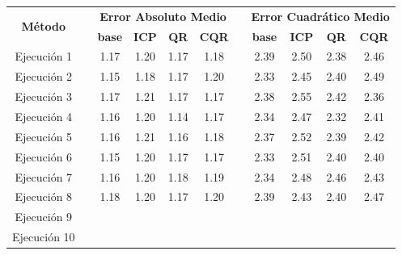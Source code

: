 \renewcommand{\arraystretch}{1.4}
\begin{table}[h]
    \small
    \begin{tabular}{clcccclcccc}
    \toprule
    \multirow{2}{*}{\textbf{Método}} &  & \multicolumn{4}{c}{\textbf{Error Absoluto Medio}}         &  & \multicolumn{4}{c}{\textbf{Error Cuadrático Medio}}           \\ \cline{3-6} \cline{8-11} 
                                    &  & \textbf{base} & \textbf{ICP} & \textbf{QR} & \textbf{CQR}  &  & \textbf{base} & \textbf{ICP} & \textbf{QR} & \textbf{CQR} \\ \cline{1-1} \cline{3-6} \cline{8-11} 
    Ejecución 1                      &  & 1.17          & 1.20         & 1.17        & 1.18         &  & 2.39          & 2.50         & 2.38        & 2.46         \\
    Ejecución 2                      &  & 1.15          & 1.18         & 1.17        & 1.20         &  & 2.33          & 2.45         & 2.40        & 2.49         \\
    Ejecución 3                      &  & 1.17          & 1.21         & 1.17        & 1.17         &  & 2.38          & 2.55         & 2.42        & 2.36         \\
    Ejecución 4                      &  & 1.16          & 1.20         & 1.14        & 1.17         &  & 2.34          & 2.47         & 2.32        & 2.41         \\
    Ejecución 5                      &  & 1.16          & 1.21         & 1.16        & 1.18         &  & 2.37          & 2.52         & 2.39        & 2.42         \\
    Ejecución 6                      &  & 1.15          & 1.20         & 1.17        & 1.17         &  & 2.33          & 2.51         & 2.40        & 2.40         \\
    Ejecución 7                      &  & 1.16          & 1.20         & 1.18        & 1.19         &  & 2.34          & 2.48         & 2.46        & 2.43         \\
    Ejecución 8                      &  & 1.18          & 1.20         & 1.17        & 1.20         &  & 2.39          & 2.43         & 2.40        & 2.47         \\
    Ejecución 9                      &  &               &              &             &              &  &               &              &             &              \\
    Ejecución 10                     &  &               &              &             &              &  &               &              &             &              \\ \cline{1-1} \cline{3-6} \cline{8-11} 

\end{tabular}
\end{table}
